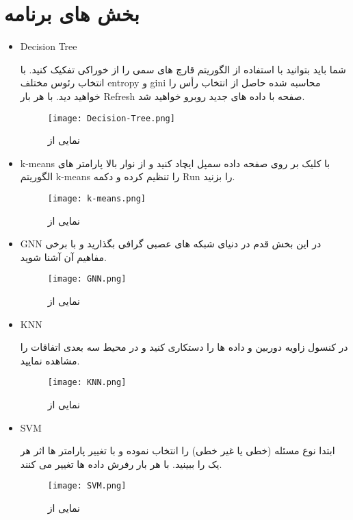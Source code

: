 \documentclass{report}
\begin{document}
	\section{بخش های برنامه}
	\begin{itemize}
		\item Decision Tree
		
		شما باید بتوانید با استفاده از الگوریتم
		قارچ های سمی را از خوراکی تفکیک کنید. با انتخاب رئوس مختلف entropy و gini محاسبه شده حاصل از انتخاب رأس را خواهید دید. با هر بار Refresh صفحه با داده های جدید روبرو خواهید شد.

			\begin{figure}
				\centering
				\texttt{[image: Decision-Tree.png]}
				\caption{نمایی از
					}
				\label{fig:Decision-Tree}
			\end{figure}
			
		\item k-means
		با کلیک بر روی صفحه داده سمپل ایچاد کنید و از نوار بالا پارامتر های الگوریتم k-means را تنظیم کرده و دکمه Run را بزنید.
				\begin{figure}
					\centering
					\texttt{[image: k-means.png]}
					\caption{نمایی از
					}
					\label{fig:k-means}
				\end{figure}
		\item GNN
		در این بخش قدم در دنیای شبکه های عصبی گرافی بگذارید و با برخی مفاهیم آن آشنا شوید.
		\begin{figure}[h]
			\centering
			\texttt{[image: GNN.png]}
			\caption{نمایی از
			}
			\label{fig:GNN}
		\end{figure}
		\item KNN
		
		در کنسول زاویه دوربین و داده ها را دستکاری کنید و در محیط سه بعدی اتفاقات را مشاهده نمایید.
		\begin{figure}
			\centering
			\texttt{[image: KNN.png]}
			\caption{نمایی از
			}
			\label{fig:KNN}
		\end{figure}
		
		\item SVM
		
		ابتدا نوع مسئله (خطی یا غیر خطی) را انتخاب نموده و با تغییر پارامتر ها اثر هر یک را ببینید. با هر بار رفرش داده ها تغییر می کنند. 
		
			\begin{figure}
			\centering
			\texttt{[image: SVM.png]}
			\caption{نمایی از
			}
			\label{fig:SVM}
		\end{figure}
		

\end{itemize}
\end{document}
